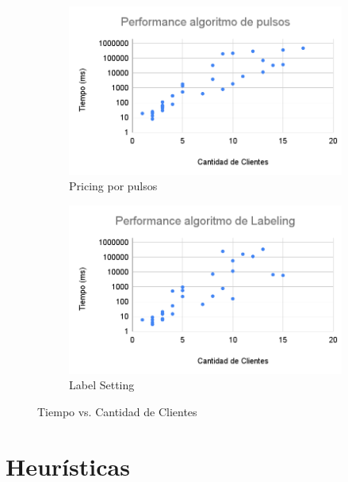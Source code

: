\begin{figure}[H]
     \begin{subfigure}[b]{0.45\textwidth}
         \centering
         \includegraphics[width=\textwidth]{img/Performance algoritmo de pulsos (1).png}
         \caption{Pricing por pulsos}
     \end{subfigure}
     \hfill
     \begin{subfigure}[b]{0.45\textwidth}
         \centering
         \includegraphics[width=\textwidth]{img/Performance algoritmo de Labeling (1).png}
         \caption{Label Setting}
     \end{subfigure}

        \caption{Tiempo vs. Cantidad de Clientes}
        \label{fig:performance-customers}
\end{figure}

\section{Heurísticas}

